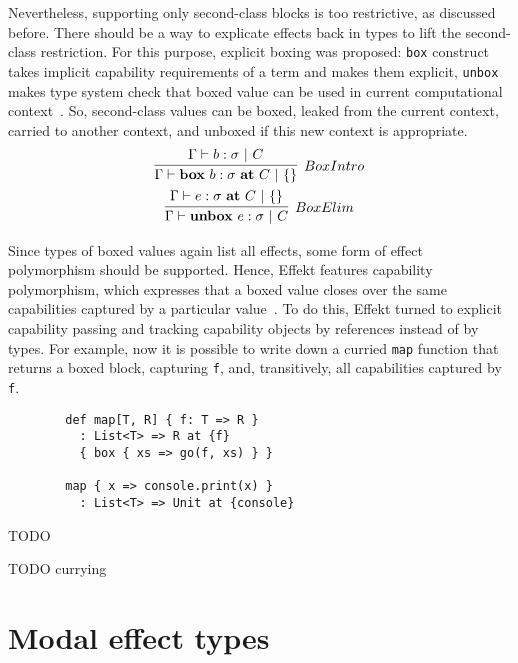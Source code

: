 \documentclass[conference]{IEEEtran}
\newcommand{\ap}{~}
\begin{document}
    Nevertheless, supporting only second-class blocks is too restrictive, as discussed before.
    There should be a way to explicate effects back in types to lift the second-class restriction.
    For this purpose, explicit boxing was proposed:
    \texttt{box} construct takes implicit capability requirements of a term and makes them explicit,
    \texttt{unbox} makes type system check that boxed value can be used in current computational context~\cite{hannan1998type, brachthauser2022effects}.
    So, second-class values can be boxed, leaked from the current context, carried to another context, and unboxed if this new context is appropriate.
    \begin{gather*}
        \infer[BoxIntro]{\Gamma \vdash \mathbf{box}\ap b : \sigma~ \mathbf{at}\ap C ~|~ \{\}}{\Gamma \vdash b : \sigma ~|~ C}
        \\
        \infer[BoxElim]{\Gamma \vdash \mathbf{unbox}\ap e : \sigma ~|~ C}{\Gamma \vdash e : \sigma ~\mathbf{at}~C ~|~ \{\}}
    \end{gather*}

    Since types of boxed values again list all effects, some form of effect polymorphism should be supported.
    Hence, Effekt features capability polymorphism, which expresses that a boxed value closes over the same capabilities captured by a particular value~\cite{brachthauser2022effects}.
    To do this, Effekt turned to explicit capability passing and tracking capability objects by references instead of by types.
    For example, now it is possible to write down a curried \texttt{map} function that returns a boxed block, capturing \texttt{f}, and, transitively, all capabilities captured by \texttt{f}.
    \begin{verbatim}
        def map[T, R] { f: T => R }
          : List<T> => R at {f}
          { box { xs => go(f, xs) } }

        map { x => console.print(x) }
          : List<T> => Unit at {console}
    \end{verbatim}





    TODO \cite{odersky2022scoped} %

    TODO currying %



    \section{Modal effect types} \label{sec:modal}
\end{document}
